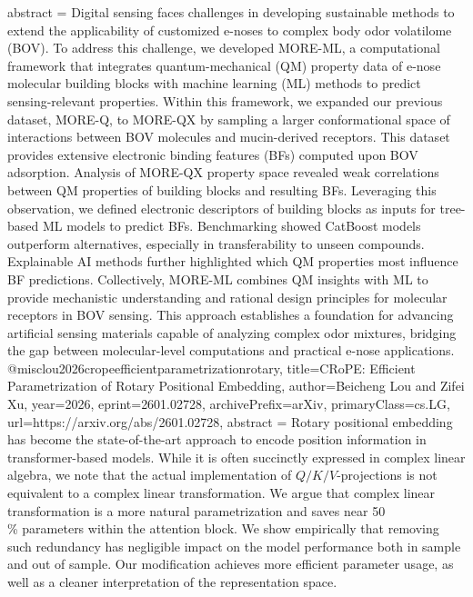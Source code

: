 {      abstract = {Digital sensing faces challenges in developing sustainable methods to extend the applicability of customized e-noses to complex body odor volatilome (BOV). To address this challenge, we developed MORE-ML, a computational framework that integrates quantum-mechanical (QM) property data of e-nose molecular building blocks with machine learning (ML) methods to predict sensing-relevant properties. Within this framework, we expanded our previous dataset, MORE-Q, to MORE-QX by sampling a larger conformational space of interactions between BOV molecules and mucin-derived receptors. This dataset provides extensive electronic binding features (BFs) computed upon BOV adsorption. Analysis of MORE-QX property space revealed weak correlations between QM properties of building blocks and resulting BFs. Leveraging this observation, we defined electronic descriptors of building blocks as inputs for tree-based ML models to predict BFs. Benchmarking showed CatBoost models outperform alternatives, especially in transferability to unseen compounds. Explainable AI methods further highlighted which QM properties most influence BF predictions. Collectively, MORE-ML combines QM insights with ML to provide mechanistic understanding and rational design principles for molecular receptors in BOV sensing. This approach establishes a foundation for advancing artificial sensing materials capable of analyzing complex odor mixtures, bridging the gap between molecular-level computations and practical e-nose applications.}
}@misc{lou2026cropeefficientparametrizationrotary,
      title={CRoPE: Efficient Parametrization of Rotary Positional Embedding}, 
      author={Beicheng Lou and Zifei Xu},
      year={2026},
      eprint={2601.02728},
      archivePrefix={arXiv},
      primaryClass={cs.LG},
      url={https://arxiv.org/abs/2601.02728},
      abstract = {Rotary positional embedding has become the state-of-the-art approach to encode position information in transformer-based models. While it is often succinctly expressed in complex linear algebra, we note that the actual implementation of $Q/K/V$-projections is not equivalent to a complex linear transformation. We argue that complex linear transformation is a more natural parametrization and saves near 50\\\% parameters within the attention block. We show empirically that removing such redundancy has negligible impact on the model performance both in sample and out of sample. Our modification achieves more efficient parameter usage, as well as a cleaner interpretation of the representation space.}
}
